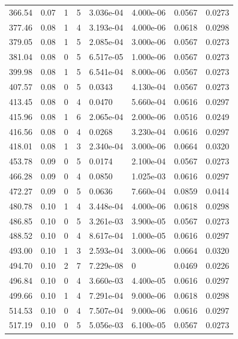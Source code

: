 \documentclass[preview]{standalone}
\begin{document}
{{{\begin{tabular}{L{1.2cm}C{1.2cm} C{0.3cm}C{0.5cm} C{1.4cm}C{1.4cm} C{1.4cm}C{1.4cm}}
  366.54  &  0.07  & 1     &  5 &  3.036e-04  & 4.000e-06  & 0.0567 &  0.0273   \\ 
  377.46  &  0.08  & 1     &  4 &  3.193e-04  & 4.000e-06  & 0.0618 &  0.0298   \\ 
  379.05  &  0.08  & 1     &  5 &  2.085e-04  & 3.000e-06  & 0.0567 &  0.0273   \\ 
  381.04  &  0.08  & 0     &  5 &  6.517e-05  & 1.000e-06  & 0.0567 &  0.0273   \\ 
  399.98  &  0.08  & 1     &  5 &  6.541e-04  & 8.000e-06  & 0.0567 &  0.0273   \\ 
  407.57  &  0.08  & 0     &  5 &  0.0343  & 4.130e-04  & 0.0567 &  0.0273   \\ 
  413.45  &  0.08  & 0     &  4 &  0.0470  & 5.660e-04  & 0.0616 &  0.0297   \\ 
  415.96  &  0.08  & 1     &  6 &  2.065e-04  & 2.000e-06  & 0.0516 &  0.0249   \\ 
  416.56  &  0.08  & 0     &  4 &  0.0268  & 3.230e-04  & 0.0616 &  0.0297   \\ 
  418.01  &  0.08  & 1     &  3 &  2.340e-04  & 3.000e-06  & 0.0664 &  0.0320   \\ 
  453.78  &  0.09  & 0     &  5 &  0.0174  & 2.100e-04  & 0.0567 &  0.0273   \\ 
  466.28  &  0.09  & 0     &  4 &  0.0850  & 1.025e-03  & 0.0616 &  0.0297   \\ 
  472.27  &  0.09  & 0     &  5 &  0.0636  & 7.660e-04  & 0.0859 &  0.0414   \\ 
  480.78  &  0.10  & 1     &  4 &  3.448e-04  & 4.000e-06  & 0.0618 &  0.0298   \\ 
  486.85  &  0.10  & 0     &  5 &  3.261e-03  & 3.900e-05  & 0.0567 &  0.0273   \\ 
  488.52  &  0.10  & 0     &  4 &  8.617e-04  & 1.000e-05  & 0.0616 &  0.0297   \\ 
  493.00  &  0.10  & 1     &  3 &  2.593e-04  & 3.000e-06  & 0.0664 &  0.0320   \\ 
  494.70  &  0.10  & 2     &  7 &  7.229e-08  & 0  & 0.0469 &  0.0226   \\ 
  496.84  &  0.10  & 0     &  4 &  3.660e-03  & 4.400e-05  & 0.0616 &  0.0297   \\ 
  499.66  &  0.10  & 1     &  4 &  7.291e-04  & 9.000e-06  & 0.0618 &  0.0298   \\ 
  514.53  &  0.10  & 0     &  4 &  7.507e-04  & 9.000e-06  & 0.0616 &  0.0297   \\ 
  517.19  &  0.10  & 0     &  5 &  5.056e-03  & 6.100e-05  & 0.0567 &  0.0273   \\ 

\end{tabular}}}}
\end{document}
